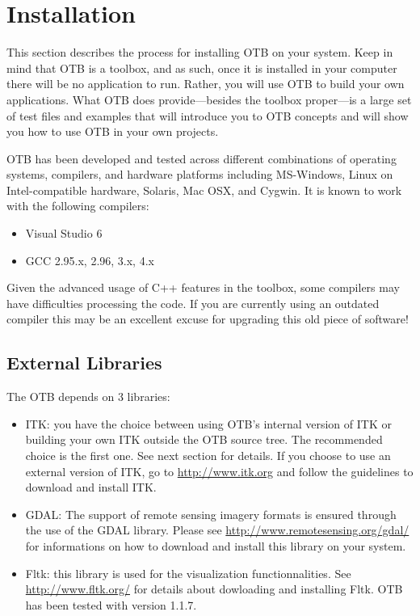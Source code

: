 \chapter{Installation}
\label{chapter:Installation}

This section describes the process for installing OTB on your system. Keep in
mind that OTB is a toolbox, and as such, once it is installed in your computer
there will be no application to run. Rather, you will use OTB to build your
own applications. What OTB does provide---besides the toolbox proper---is a
large set of test files and examples that will introduce you to OTB concepts
and will show you how to use OTB in your own projects.


OTB has been developed and tested across different combinations of
operating systems, compilers, and hardware platforms including
MS-Windows, Linux on Intel-compatible hardware, Solaris, Mac
OSX, and Cygwin.  It is known to work with the following compilers:
\begin{itemize}
\item Visual Studio 6%
\item GCC 2.95.x, 2.96, 3.x, 4.x
\end{itemize}

Given the advanced usage of C++ features in the toolbox, some
compilers may have difficulties processing the code. If you are
currently using an outdated compiler this may be an excellent excuse
for upgrading this old piece of software!

\section{External Libraries}

The OTB depends on 3 libraries:
\begin{itemize}
  \item ITK: you have the choice between using OTB's internal version
  of ITK or building your own ITK outside the OTB source tree. The
  recommended choice is the first one. See next section for
  details. If you choose to use an external version of ITK, go to
  \url{http://www.itk.org} and follow the guidelines to download and
  install ITK.
  \item GDAL: The support of remote sensing imagery formats is ensured
    through the use of the GDAL library. Please see
\url{http://www.remotesensing.org/gdal/} for informations on how to
download and install this library on your system.
\item Fltk: this library is used for the visualization
  functionnalities. See \url{http://www.fltk.org/} for details about
  dowloading and installing Fltk. OTB has been tested with version 1.1.7.
\end{itemize}


